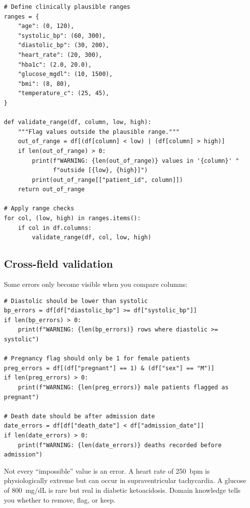 \begin{verbatim}
# Define clinically plausible ranges
ranges = {
    "age": (0, 120),
    "systolic_bp": (60, 300),
    "diastolic_bp": (30, 200),
    "heart_rate": (20, 300),
    "hba1c": (2.0, 20.0),
    "glucose_mgdl": (10, 1500),
    "bmi": (8, 80),
    "temperature_c": (25, 45),
}

def validate_range(df, column, low, high):
    """Flag values outside the plausible range."""
    out_of_range = df[(df[column] < low) | (df[column] > high)]
    if len(out_of_range) > 0:
        print(f"WARNING: {len(out_of_range)} values in '{column}' "
              f"outside [{low}, {high}]")
        print(out_of_range[["patient_id", column]])
    return out_of_range

# Apply range checks
for col, (low, high) in ranges.items():
    if col in df.columns:
        validate_range(df, col, low, high)
\end{verbatim}

\subsection{Cross-field validation}

Some errors only become visible when you compare columns:

\begin{verbatim}
# Diastolic should be lower than systolic
bp_errors = df[df["diastolic_bp"] >= df["systolic_bp"]]
if len(bp_errors) > 0:
    print(f"WARNING: {len(bp_errors)} rows where diastolic >= systolic")

# Pregnancy flag should only be 1 for female patients
preg_errors = df[(df["pregnant"] == 1) & (df["sex"] == "M")]
if len(preg_errors) > 0:
    print(f"WARNING: {len(preg_errors)} male patients flagged as pregnant")

# Death date should be after admission date
date_errors = df[df["death_date"] < df["admission_date"]]
if len(date_errors) > 0:
    print(f"WARNING: {len(date_errors)} deaths recorded before admission")
\end{verbatim}

\begin{clinicalnote}
Not every ``impossible'' value is an error. A heart rate of 250~bpm is physiologically extreme but can occur in supraventricular tachycardia. A glucose of 800~mg/dL is rare but real in diabetic ketoacidosis. Domain knowledge tells you whether to remove, flag, or keep.
\end{clinicalnote}

